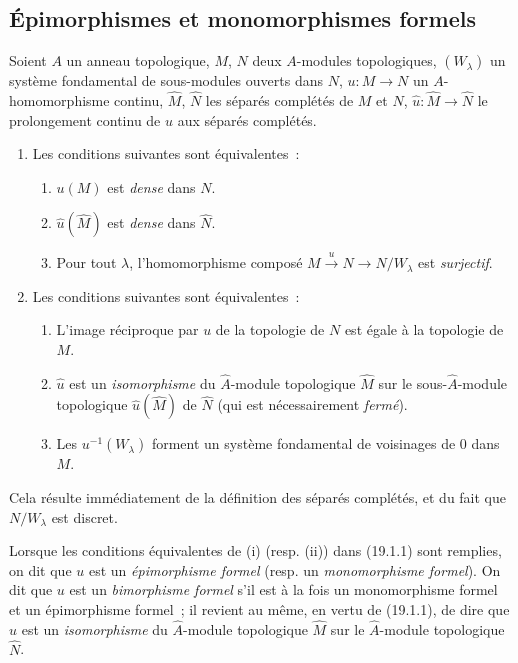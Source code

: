 \subsection{Épimorphismes et monomorphismes formels}
\label{subsection:0.19.1-fr}

\begin{proposition}[19.1.1]
\label{0.19.1.1-fr}
Soient $A$ un anneau topologique, $M$, $N$ deux $A$-modules topologiques,
$(W_\lambda)$ un système fondamental de sous-modules ouverts dans $N$,
$u:M\to N$ un $A$-homomorphisme continu, $\widehat M$, $\widehat N$ les
séparés complétés de $M$ et $N$, $\widehat u:\widehat M\to\widehat N$ le
prolongement continu de $u$ aux séparés complétés.
\begin{enumerate}
  \item[(i)] Les conditions suivantes sont équivalentes~:
  \begin{enumerate}
    \item[a)] $u(M)$ est \emph{dense} dans $N$.
    \item[a$'$)] $\widehat u(\widehat M)$ est \emph{dense} dans $\widehat N$.
    \item[a$''$)] Pour tout $\lambda$, l'homomorphisme composé
    $M\xrightarrow{u}N\to N/W_\lambda$ est \emph{surjectif}.
  \end{enumerate}
  \item[(ii)] Les conditions suivantes sont équivalentes~:
  \begin{enumerate}
    \item[b)] L'image réciproque par $u$ de la topologie de $N$ est égale à la
    topologie de $M$.
    \item[b$'$)] $\widehat u$ est un \emph{isomorphisme} du $\widehat A$-module
    topologique $\widehat M$ sur le sous-$\widehat A$-module topologique
    $\widehat u(\widehat M)$ de $\widehat N$ (qui est nécessairement
    \emph{fermé}).
    \item[b$''$)] Les $u^{-1}(W_\lambda)$ forment un système fondamental de
    voisinages de 0 dans $M$.
  \end{enumerate}
\end{enumerate}
Cela résulte immédiatement de la définition des séparés complétés, et du fait
que $N/W_\lambda$ est discret.
\end{proposition}

\begin{env}[19.1.2]
\label{0.19.1.2-fr}
Lorsque les conditions équivalentes de (i) (resp. (ii)) dans (19.1.1) sont
remplies, on dit que $u$ est un \emph{épimorphisme formel} (resp. un
\emph{monomorphisme formel}). On dit que $u$ est un \emph{bimorphisme formel}
s'il est à la fois un monomorphisme formel et un épimorphisme formel~; il
revient au même, en vertu de (19.1.1), de dire que $\widehat u$ est un
\emph{isomorphisme} du $\widehat A$-module topologique $\widehat M$ sur le
$\widehat A$-module topologique $\widehat N$.
\end{env}

